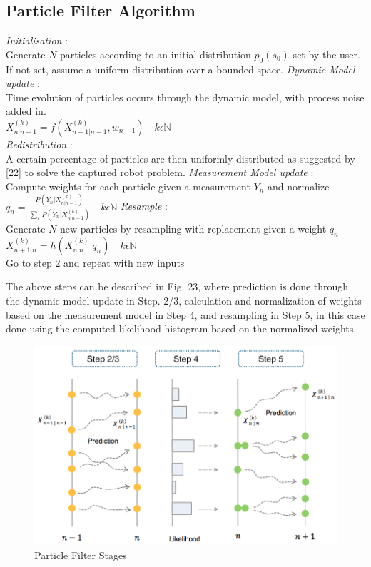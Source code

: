 \documentclass[a4paper]{IEEEtran}
\begin{document}
\subsection{Particle Filter Algorithm}
\begin{algorithmic}[1]
\STATE \textit{Initialisation} : \\
Generate $N$ particles according to an initial distribution $p_{0}(s_{0})$ set by the user. If not set, assume a uniform distribution over a bounded space.
\STATE \textit{Dynamic Model update} : \\
Time evolution of particles occurs through the dynamic model, with process noise added in.\\
$X_{n|n-1}^{(k)}=f(X_{n-1|n-1}^{(k)},w_{n-1})\quad k\epsilon\mathbb{N}$\\
\STATE \textit{Redistribution} : \\
A certain percentage of particles are then uniformly distributed as suggested by [22] to solve the captured robot problem.
\STATE \textit{Measurement Model update} : \\
Compute weights for each particle given a measurement $Y_{n}$ and normalize \\
$q_{n}=\frac{P(Y_{n}|X_{n|n-1}^{(k)})}{\sum_{k}P(Y_{n}|X_{n|n-1}^{(k)})}\quad k\epsilon\mathbb{N}$
\STATE \textit{Resample} : \\
Generate $N$ new particles by resampling with replacement given a weight $q_{n}$ \\
$X_{n+1|n}^{(k)}=h(X_{n|n}^{(k)}|q_{n})\quad k\epsilon\mathbb{N}$ \\
\STATE Go to step 2 and repeat with new inputs
\end{algorithmic} 

The above steps can be described in Fig. 23, where prediction is done through the dynamic model update in Step. 2/3, calculation and normalization of weights based on the measurement model in Step 4, and resampling in Step 5, in this case done using the computed likelihood histogram based on the normalized weights.

\begin{figure}[h!]
  \centering
  \includegraphics[scale=0.3]{resample}
  \captionsetup{justification=centering}
  \caption{Particle Filter Stages}
\end{figure}
\end{document}
